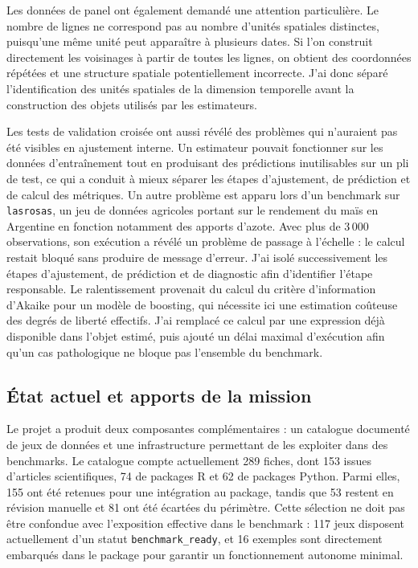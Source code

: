 \documentclass[11pt,a4paper]{article}
\begin{document}
Les données de panel ont également demandé une attention particulière. Le nombre de lignes ne correspond pas au nombre d'unités spatiales distinctes, puisqu'une même unité peut apparaître à plusieurs dates. Si l'on construit directement les voisinages à partir de toutes les lignes, on obtient des coordonnées répétées et une structure spatiale potentiellement incorrecte. J'ai donc séparé l'identification des unités spatiales de la dimension temporelle avant la construction des objets utilisés par les estimateurs.

Les tests de validation croisée ont aussi révélé des problèmes qui n'auraient pas été visibles en ajustement interne. Un estimateur pouvait fonctionner sur les données d'entraînement tout en produisant des prédictions inutilisables sur un pli de test, ce qui a conduit à mieux séparer les étapes d'ajustement, de prédiction et de calcul des métriques. Un autre problème est apparu lors d'un benchmark sur \texttt{lasrosas}, un jeu de données agricoles portant sur le rendement du maïs en Argentine en fonction notamment des apports d'azote. Avec plus de 3\,000 observations, son exécution a révélé un problème de passage à l'échelle : le calcul restait bloqué sans produire de message d'erreur. J'ai isolé successivement les étapes d'ajustement, de prédiction et de diagnostic afin d'identifier l'étape responsable. Le ralentissement provenait du calcul du critère d'information d'Akaike pour un modèle de boosting, qui nécessite ici une estimation coûteuse des degrés de liberté effectifs. J'ai remplacé ce calcul par une expression déjà disponible dans l'objet estimé, puis ajouté un délai maximal d'exécution afin qu'un cas pathologique ne bloque pas l'ensemble du benchmark.


\subsection{État actuel et apports de la mission}

Le projet a produit deux composantes complémentaires : un catalogue documenté de jeux de données et une infrastructure permettant de les exploiter dans des benchmarks. Le catalogue compte actuellement 289 fiches, dont 153 issues d'articles scientifiques, 74 de packages R et 62 de packages Python. Parmi elles, 155 ont été retenues pour une intégration au package, tandis que 53 restent en révision manuelle et 81 ont été écartées du périmètre. Cette sélection ne doit pas être confondue avec l'exposition effective dans le benchmark : 117 jeux disposent actuellement d'un statut \texttt{benchmark\_ready}, et 16 exemples sont directement embarqués dans le package pour garantir un fonctionnement autonome minimal.
\end{document}
